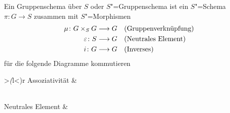 \begin{Definition}[Gruppenschema]\label{def:gruppenschema}
  Ein Gruppenschema über $S$ oder $S$"=Gruppenschema ist ein
  $S$"=Schema ${\pi\colon G\to S}$ zusammen mit $S$"=Morphismen
  \begin{align*}
    \mu\colon G\times_S G &\longrightarrow G
    &&\text{(Gruppenverknüpfung)}\\
    \varepsilon\colon S&\longrightarrow G 
    &&\text{(Neutrales Element)}\\
    i\colon G &\longrightarrow G    
    &&\text{(Inverses)}
  \end{align*}
  für die folgende Diagramme kommutieren\\[1em]
  \begin{tabular}{>{\itshape(}l<{)}r}
    Assoziativität
    &
    \\[3.5em]
    Neutrales Element
    &
\end{tabular}
\end{Definition}
